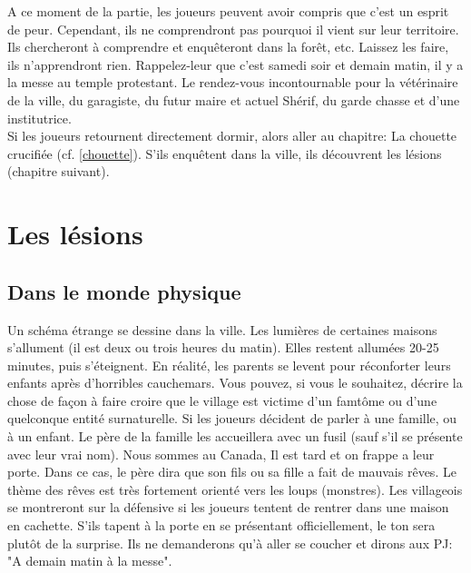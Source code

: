 \documentclass[oneside,12pt]{book}
\begin{document}
\begin{flushleft}
A ce moment de la partie, les joueurs peuvent avoir compris que c'est un esprit de peur. Cependant, ils ne comprendront pas pourquoi il vient sur leur territoire. Ils chercheront à comprendre et enquêteront dans la forêt, etc. Laissez les faire, ils n'apprendront rien. Rappelez-leur que c'est samedi soir et demain matin, il y a la messe au temple protestant. Le rendez-vous incontournable pour la vétérinaire de la ville, du garagiste, du futur maire et actuel Shérif, du garde chasse et d'une institutrice.\\  
Si les joueurs retournent directement dormir, alors aller au chapitre: La chouette crucifiée (cf. \ref{chouette}). S'ils enquêtent dans la ville, ils découvrent les lésions (chapitre suivant).


\section{Les lésions}
\subsection{Dans le monde physique}
\label{physique_enquete}
Un schéma étrange se dessine dans la ville. 
Les lumières de certaines maisons s'allument (il est deux ou trois heures du matin).
Elles restent allumées 20-25 minutes, puis s’éteignent. 
En réalité, les parents se levent pour réconforter leurs enfants après d'horribles cauchemars. 
Vous pouvez, si vous le souhaitez, décrire la chose de façon à faire croire que le village est 
victime d'un famtôme ou d'une quelconque entité surnaturelle.
Si les joueurs décident de parler à une famille, ou à un enfant. 
Le père de la famille les accueillera avec un fusil (sauf s'il se présente avec leur vrai nom). 
Nous sommes au Canada, Il est tard et on frappe a leur porte. 
Dans ce cas, le père dira que son fils ou sa fille a fait de mauvais rêves. 
Le thème des rêves est très fortement orienté vers les loups (monstres). 
Les villageois se montreront sur la défensive si les joueurs tentent de rentrer dans une maison en cachette.
S'ils tapent à la porte en se présentant officiellement, le ton sera plutôt de la surprise. 
Ils ne demanderons qu'à aller se coucher et dirons aux PJ: "A demain matin à la messe".


\end{flushleft}
\end{document}
